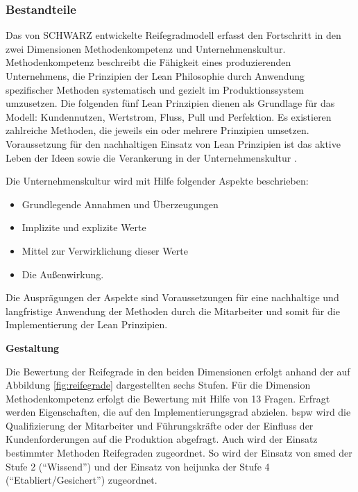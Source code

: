 \subsubsection{Bestandteile}
Das von SCHWARZ entwickelte Reifegradmodell erfasst den Fortschritt in den zwei Dimensionen Methodenkompetenz und Unternehmenskultur. 
Methodenkompetenz beschreibt die Fähigkeit eines produzierenden Unternehmens, die Prinzipien der Lean Philosophie durch Anwendung spezifischer Methoden systematisch und gezielt im Produktionssystem umzusetzen. 
Die folgenden fünf Lean Prinzipien dienen als Grundlage für das Modell: Kundennutzen, Wertstrom, Fluss, Pull und Perfektion. 
Es existieren zahlreiche Methoden, die jeweils ein oder mehrere Prinzipien umsetzen. 
%
Voraussetzung für den nachhaltigen Einsatz von Lean Prinzipien ist das aktive Leben der Ideen sowie die Verankerung in der Unternehmenskultur \cite{Baumgaertner2006}. 

Die Unternehmenskultur wird mit Hilfe folgender Aspekte beschrieben: 
\begin{itemize}
 \item Grundlegende Annahmen und Überzeugungen
\item Implizite und explizite Werte 
\item Mittel zur Verwirklichung dieser Werte
\item Die Außenwirkung.
\end{itemize}
Die Ausprägungen der Aspekte sind Voraussetzungen für eine nachhaltige und langfristige Anwendung der Methoden durch die Mitarbeiter und somit für die Implementierung der Lean Prinzipien. 

\textbf{Gestaltung}

Die Bewertung der Reifegrade in den beiden Dimensionen erfolgt anhand der auf Abbildung \ref{fig:reifegrade} dargestellten sechs Stufen. 
%
Für die Dimension Methodenkompetenz erfolgt die Bewertung mit Hilfe von 13 Fragen. Erfragt werden Eigenschaften, die auf den Implementierungsgrad abzielen. \Gls{bspw} wird die Qualifizierung der Mitarbeiter und Führungskräfte oder der Einfluss der Kundenforderungen auf die Produktion abgefragt. 
Auch wird der Einsatz bestimmter Methoden Reifegraden zugeordnet. So wird der Einsatz von \gls{smed} der Stufe 2 (``Wissend'') und der Einsatz von \gls{heijunka} der Stufe 4 (``Etabliert/Gesichert'') zugeordnet. 

